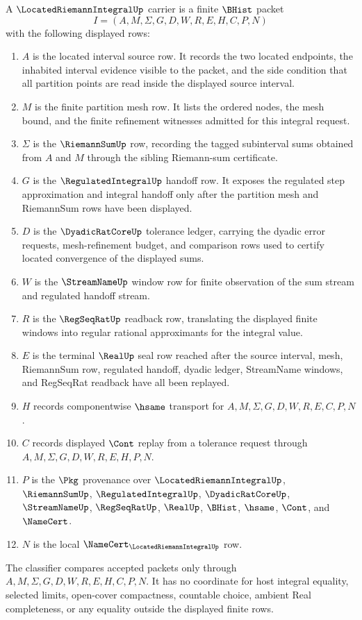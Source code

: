 \begin{definition}
\label{def:located-riemann-integral-carrier}
A $\LocatedRiemannIntegralUp$ carrier is a finite $\BHist$ packet
$$
I=(A,M,\Sigma,G,D,W,R,E,H,C,P,N)
$$
with the following displayed rows:
\begin{enumerate}
\item $A$ is the located interval source row. It records the two located endpoints, the inhabited interval evidence visible to the packet, and the side condition that all partition points are read inside the displayed source interval.
\item $M$ is the finite partition mesh row. It lists the ordered nodes, the mesh bound, and the finite refinement witnesses admitted for this integral request.
\item $\Sigma$ is the $\RiemannSumUp$ row, recording the tagged subinterval sums obtained from $A$ and $M$ through the sibling Riemann-sum certificate.
\item $G$ is the $\RegulatedIntegralUp$ handoff row. It exposes the regulated step approximation and integral handoff only after the partition mesh and RiemannSum rows have been displayed.
\item $D$ is the $\DyadicRatCoreUp$ tolerance ledger, carrying the dyadic error requests, mesh-refinement budget, and comparison rows used to certify located convergence of the displayed sums.
\item $W$ is the $\StreamNameUp$ window row for finite observation of the sum stream and regulated handoff stream.
\item $R$ is the $\RegSeqRatUp$ readback row, translating the displayed finite windows into regular rational approximants for the integral value.
\item $E$ is the terminal $\RealUp$ seal row reached after the source interval, mesh, RiemannSum row, regulated handoff, dyadic ledger, StreamName windows, and RegSeqRat readback have all been replayed.
\item $H$ records componentwise $\hsame$ transport for $A,M,\Sigma,G,D,W,R,E,C,P,N$.
\item $C$ records displayed $\Cont$ replay from a tolerance request through $A,M,\Sigma,G,D,W,R,E,H,P,N$.
\item $P$ is the $\Pkg$ provenance over $\LocatedRiemannIntegralUp$, $\RiemannSumUp$, $\RegulatedIntegralUp$, $\DyadicRatCoreUp$, $\StreamNameUp$, $\RegSeqRatUp$, $\RealUp$, $\BHist$, $\hsame$, $\Cont$, and $\NameCert$.
\item $N$ is the local $\NameCert_{\LocatedRiemannIntegralUp}$ row.
\end{enumerate}
The classifier compares accepted packets only through $A,M,\Sigma,G,D,W,R,E,H,C,P,N$. It has no coordinate for host integral equality, selected limits, open-cover compactness, countable choice, ambient Real completeness, or any equality outside the displayed finite rows.
\end{definition}

